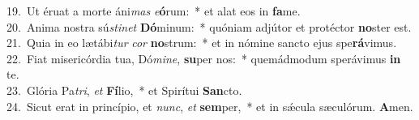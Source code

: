 {19.~}Ut éruat a morte áni\textit{mas} \textit{e}\textbf{ó}rum:~* et alat eos in \textbf{fa}me.\\
{20.~}Anima nostra sú\textit{sti}\textit{net} \textbf{Dó}minum:~* quóniam adjútor et protéctor \textbf{no}ster est.\\
{21.~}Quia in eo lætábi\textit{tur} \textit{cor} \textbf{no}strum:~* et in nómine sancto ejus spe\textbf{rá}vimus.\\
{22.~}Fiat misericórdia tua, Dó\textit{mi}\textit{ne}, \textbf{su}per nos:~* quemádmodum sperávimus \textbf{in} te.\\
{23.~}Glória Pa\textit{tri}, \textit{et} \textbf{Fí}lio,~* et Spirítui \textbf{San}cto.\\
{24.~}Sicut erat in princípio, et \textit{nunc}, \textit{et} \textbf{sem}per,~* et in sǽcula sæculórum. \textbf{A}men.\\
